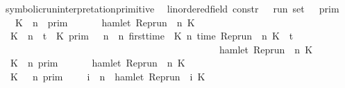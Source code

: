 \begin{isabellebody}
\isanewline
\isanewline
{}\isamarkupfalse%
\ symbolic{\isacharunderscore}run{\isacharunderscore}interpretation{\isacharunderscore}primitive\isanewline
\ \ {\isacharcolon}{\isacharcolon}{\isacartoucheopen}{\isacharparenleft}{\isacharprime}{\isasymtau}{\isacharcolon}{\isacharcolon}linordered{\isacharunderscore}field{\isacharparenright}\ constr\ {\isasymRightarrow}\ {\isacharprime}{\isasymtau}\ run\ set{\isacartoucheclose}\ {\isacharparenleft}{\isachardoublequoteopen}{\isasymlbrakk}\ {\isacharunderscore}\ {\isasymrbrakk}\isactrlsub p\isactrlsub r\isactrlsub i\isactrlsub m{\isachardoublequoteclose}{\isacharparenright}\isanewline
{}\isanewline
\ \ {\isacartoucheopen}{\isasymlbrakk}\ K\ {\isasymUp}\ n\ \ {\isasymrbrakk}\isactrlsub p\isactrlsub r\isactrlsub i\isactrlsub m\ \ \ \ \ {\isacharequal}\ {\isacharbraceleft}{\isasymrho}{\isachardot}\ hamlet\ {\isacharparenleft}{\isacharparenleft}Rep{\isacharunderscore}run\ {\isasymrho}{\isacharparenright}\ n\ K{\isacharparenright}\ {\isacharbraceright}{\isacartoucheclose}\isanewline
{\isacharbar}\ {\isacartoucheopen}{\isasymlbrakk}\ K\ {\isacharat}\ n\ {\isasymoplus}\ {\isasymdelta}t\ {\isasymRightarrow}\ K{\isacharprime}\ {\isasymrbrakk}\isactrlsub p\isactrlsub r\isactrlsub i\isactrlsub m\ {\isacharequal}\ {\isacharbraceleft}{\isasymrho}{\isachardot}\ {\isasymforall}n\ {\isasymge}\ n\ first{\isacharunderscore}time\ {\isasymrho}\ K\ n\ {\isacharparenleft}time\ {\isacharparenleft}{\isacharparenleft}Rep{\isacharunderscore}run\ {\isasymrho}{\isacharparenright}\ n\ K{\isacharparenright}\ {\isacharplus}\ {\isasymdelta}t{\isacharparenright}\isanewline
\ \ \ \ \ \ \ \ \ \ \ \ \ \ \ \ \ \ \ \ \ \ \ \ \ \ \ \ \ \ \ \ \ \ \ \ \ \ \ \ \ \ \ \ {\isasymlongrightarrow}\ hamlet\ {\isacharparenleft}{\isacharparenleft}Rep{\isacharunderscore}run\ {\isasymrho}{\isacharparenright}\ n\ K{\isacharprime}{\isacharparenright}{\isacharbraceright}{\isacartoucheclose}\isanewline
{\isacharbar}\ {\isacartoucheopen}{\isasymlbrakk}\ K\ {\isasymnot}{\isasymUp}\ n\ {\isasymrbrakk}\isactrlsub p\isactrlsub r\isactrlsub i\isactrlsub m\ \ \ \ \ {\isacharequal}\ {\isacharbraceleft}{\isasymrho}{\isachardot}\ {\isasymnot}hamlet\ {\isacharparenleft}{\isacharparenleft}Rep{\isacharunderscore}run\ {\isasymrho}{\isacharparenright}\ n\ K{\isacharparenright}\ {\isacharbraceright}{\isacartoucheclose}\isanewline
{\isacharbar}\ {\isacartoucheopen}{\isasymlbrakk}\ K\ {\isasymnot}{\isasymUp}\ {\isacharless}\ n\ {\isasymrbrakk}\isactrlsub p\isactrlsub r\isactrlsub i\isactrlsub m\ \ \ {\isacharequal}\ {\isacharbraceleft}{\isasymrho}{\isachardot}\ {\isasymforall}i\ {\isacharless}\ n{\isachardot}\ {\isasymnot}\ hamlet\ {\isacharparenleft}{\isacharparenleft}Rep{\isacharunderscore}run\ {\isasymrho}{\isacharparenright}\ i\ K{\isacharparenright}{\isacharbraceright}{\isacartoucheclose}\isanewline

\end{isabellebody}
